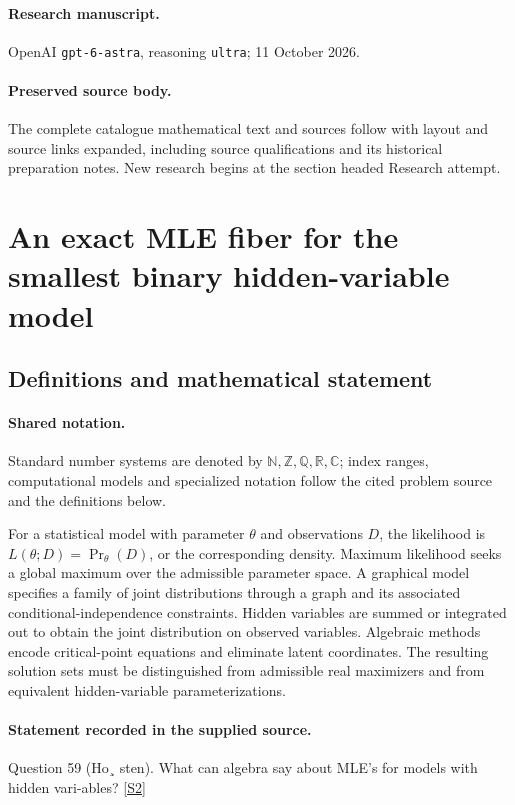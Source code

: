 \documentclass[11pt]{article}
\begin{document}
\paragraph{Research manuscript.} OpenAI \texttt{gpt-6-astra}, reasoning \texttt{ultra}; 11 October 2026.
\paragraph{Preserved source body.} The complete catalogue mathematical text and sources follow with layout and source links expanded, including source qualifications and its historical preparation notes. New research begins at the section headed Research attempt.

\section{An exact MLE fiber for the smallest binary hidden-variable model}\label{statement}

\subsection{Definitions and mathematical statement}

\paragraph{Shared notation.}Standard number systems are denoted by $\mathbb N,\mathbb Z,\mathbb Q,\mathbb R,\mathbb C$; index ranges, computational models and specialized notation follow the cited problem source and the definitions below.


For a statistical model with parameter $\theta$ and observations $D$, the likelihood is $L(\theta;D)=\Pr_\theta(D)$, or the corresponding density. Maximum likelihood seeks a global maximum over the admissible parameter space. A graphical model specifies a family of joint distributions through a graph and its associated conditional-independence constraints. Hidden variables are summed or integrated out to obtain the joint distribution on observed variables. Algebraic methods encode critical-point equations and eliminate latent coordinates. The resulting solution sets must be distinguished from admissible real maximizers and from equivalent hidden-variable parameterizations.
\paragraph{Statement recorded in the supplied source.}
Question 59 (Ho¸ sten). What can algebra say about MLE's for models with hidden vari-ables? \href{https://aimath.org/WWN/compalgstat/compalgstat.pdf}{[S2]}
\end{document}
